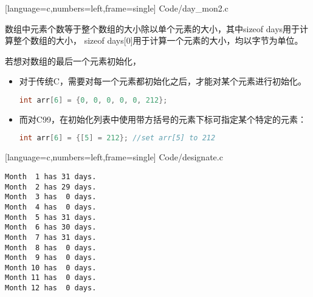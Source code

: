 \begin{frame}[fragile]

[language=c,numbers=left,frame=single]
{Code/day_mon2.c}
\end{frame}

\begin{frame}[fragile]
  数组中元素个数等于整个数组的大小除以单个元素的大小，其中{\tf sizeof days}用于计算整个数组的大小，
  {\tf sizeof days[0]}用于计算一个元素的大小，均以字节为单位。
\end{frame}

\begin{frame}[fragile]
若想对数组的最后一个元素初始化，\vspace{0.1in}

\begin{itemize}
\item 
对于传统C，需要对每一个元素都初始化之后，才能对某个元素进行初始化。
\begin{lstlisting}[language=c,backgroundcolor=\color{red!20}]
  int arr[6] = {0, 0, 0, 0, 0, 212};
\end{lstlisting}
\pause\vspace{0.1in}

\item 
而对C99，在初始化列表中使用带方括号的元素下标可指定某个特定的元素：
\begin{lstlisting}[language=c,backgroundcolor=\color{red!20}]
int arr[6] = {[5] = 212}; //set arr[5] to 212
\end{lstlisting}
\end{itemize}
\end{frame}

\begin{frame}[fragile]

[language=c,numbers=left,frame=single]
{Code/designate.c}
\end{frame}

\begin{frame}[fragile]
\begin{lstlisting}[backgroundcolor=\color{red!20}]
Month  1 has 31 days.
Month  2 has 29 days.
Month  3 has  0 days.
Month  4 has  0 days.
Month  5 has 31 days.
Month  6 has 30 days.
Month  7 has 31 days.
Month  8 has  0 days.
Month  9 has  0 days.
Month 10 has  0 days.
Month 11 has  0 days.
Month 12 has  0 days.
\end{lstlisting}
\end{frame}

